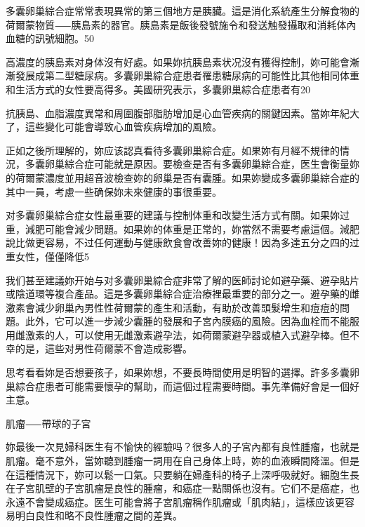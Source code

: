 \documentclass[12pt,UTF8]{ctexbook}
\begin{document}
多囊卵巢綜合症常常表現異常的第三個地方是胰臟。這是消化系統產生分解食物的荷爾蒙物質⸺胰島素的器官。胰島素是飯後發號施令和發送触發攝取和消耗体內血糖的訊號細胞。50%

高濃度的胰島素对身体沒有好處。如果妳抗胰島素状况沒有獲得控制，妳可能會漸漸發展成第二型糖尿病。多囊卵巢綜合症患者罹患糖尿病的可能性比其他相同体重和生活方式的女性要高得多。美國研究表示，多囊卵巢綜合症患者有20%

抗胰島、血脂濃度異常和周圍腹部脂肪增加是心血管疾病的關鍵因素。當妳年紀大了，這些變化可能會導致心血管疾病增加的風險。

正如之後所理解的，妳应该認真看待多囊卵巢綜合症。如果妳有月經不規律的情況，多囊卵巢綜合症可能就是原因。要檢查是否有多囊卵巢綜合症，医生會衡量妳的荷爾蒙濃度並用超音波檢查妳的卵巢是否有囊腫。如果妳變成多囊卵巢綜合症的其中一員，考慮一些确保妳未來健康的事很重要。

对多囊卵巢綜合症女性最重要的建議与控制体重和改變生活方式有關。如果妳过重，減肥可能會減少問題。如果妳的体重是正常的，妳當然不需要考慮這個。減肥說比做更容易，不过任何運動与健康飲食會改善妳的健康！因為多達五分之四的过重女性，僅僅降低5%

我们甚至建議妳开始与对多囊卵巢綜合症非常了解的医師討论如避孕藥、避孕貼片或陰道環等複合產品。這是多囊卵巢綜合症治療裡最重要的部分之一。避孕藥的雌激素會減少卵巢內男性性荷爾蒙的產生和活動，有助於改善頭髮增生和痘痘的問題。此外，它可以進一步減少囊腫的發展和子宮內膜癌的風險。因為血栓而不能服用雌激素的人，可以使用无雌激素避孕法，如荷爾蒙避孕器或植入式避孕棒。但不幸的是，這些对男性荷爾蒙不會造成影響。

思考看看妳是否想要孩子，如果妳想，不要長時間使用是明智的選擇。許多多囊卵巢綜合症患者可能需要懷孕的幫助，而這個过程需要時間。事先準備好會是一個好主意。





肌瘤⸺帶球的子宮




妳最後一次見婦科医生有不愉快的經驗吗？很多人的子宮內都有良性腫瘤，也就是肌瘤。毫不意外，當妳聽到腫瘤一詞用在自己身体上時，妳的血液瞬間降溫。但是在這種情況下，妳可以鬆一口氣。只要躺在婦產科的椅子上深呼吸就好。細胞生長在子宮肌壁的子宮肌瘤是良性的腫瘤，和癌症一點關係也沒有。它们不是癌症，也永遠不會變成癌症。医生可能會將子宮肌瘤稱作肌瘤或「肌肉結」，這樣应该更容易明白良性和略不良性腫瘤之間的差異。
\end{document}
